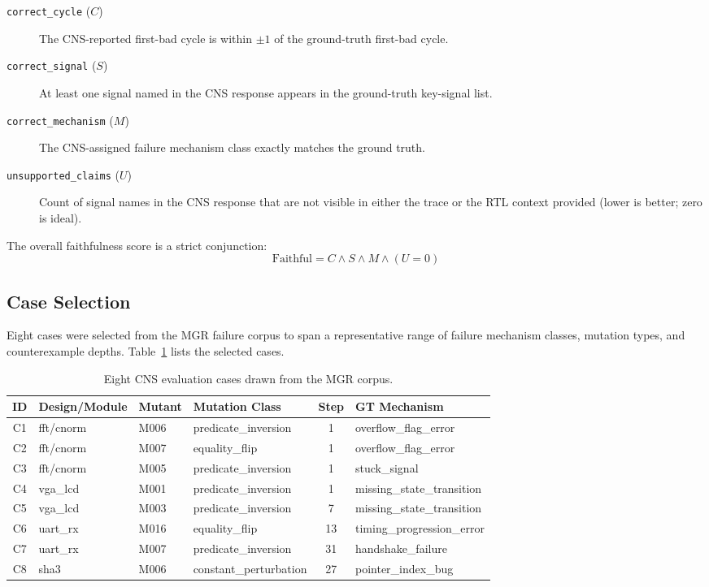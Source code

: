 \documentclass[11pt,a4paper]{article}
\newcommand{\metric}[1]{\texttt{#1}}
\begin{document}
\begin{description}
  \item[\metric{correct\_cycle} ($C$)] The CNS-reported first-bad cycle is
    within $\pm 1$ of the ground-truth first-bad cycle.
  \item[\metric{correct\_signal} ($S$)] At least one signal named in the CNS
    response appears in the ground-truth key-signal list.
  \item[\metric{correct\_mechanism} ($M$)] The CNS-assigned failure mechanism
    class exactly matches the ground truth.
  \item[\metric{unsupported\_claims} ($U$)] Count of signal names in the CNS
    response that are not visible in either the trace or the RTL context
    provided (lower is better; zero is ideal).
\end{description}

The overall faithfulness score is a strict conjunction:
\[
  \text{Faithful} = C \wedge S \wedge M \wedge (U = 0)
\]

\subsection{Case Selection}

Eight cases were selected from the MGR failure corpus to span a representative
range of failure mechanism classes, mutation types, and counterexample depths.
Table~\ref{tab:cases} lists the selected cases.

\begin{table}[H]
\centering
\small
\caption{Eight CNS evaluation cases drawn from the MGR corpus.}
\label{tab:cases}
\begin{tabular}{clllcl}
\toprule
\textbf{ID} & \textbf{Design/Module} & \textbf{Mutant} &
  \textbf{Mutation Class} & \textbf{Step} & \textbf{GT Mechanism} \\
\midrule
C1 & fft/cnorm & M006 & predicate\_inversion  & 1  & overflow\_flag\_error \\
C2 & fft/cnorm & M007 & equality\_flip         & 1  & overflow\_flag\_error \\
C3 & fft/cnorm & M005 & predicate\_inversion   & 1  & stuck\_signal \\
C4 & vga\_lcd  & M001 & predicate\_inversion   & 1  & missing\_state\_transition \\
C5 & vga\_lcd  & M003 & predicate\_inversion   & 7  & missing\_state\_transition \\
C6 & uart\_rx  & M016 & equality\_flip         & 13 & timing\_progression\_error \\
C7 & uart\_rx  & M007 & predicate\_inversion   & 31 & handshake\_failure \\
C8 & sha3      & M006 & constant\_perturbation & 27 & pointer\_index\_bug \\
\bottomrule
\end{tabular}
\end{table}
\end{document}
